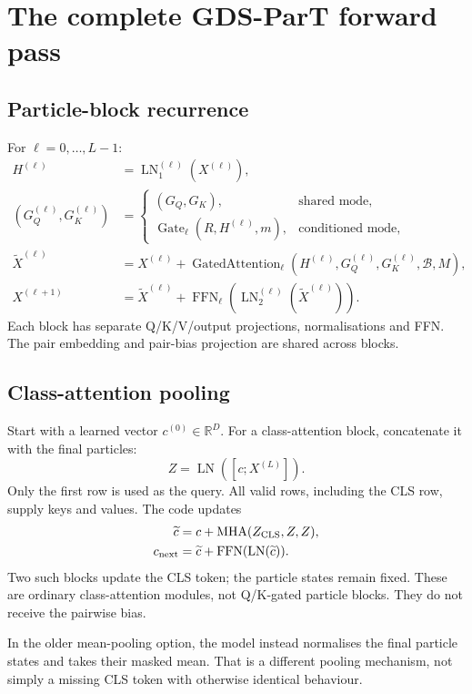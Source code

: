 \documentclass[11pt,a4paper]{article}
\newcommand{\R}{\mathbb R}
\newcommand{\LN}{\operatorname{LN}}
\newcommand{\FFN}{\operatorname{FFN}}
\numberwithin{equation}{section}
\begin{document}
\section{The complete GDS-ParT forward pass}
\subsection{Particle-block recurrence}
For $\ell=0,\ldots,L-1$:
\begin{align}
 H^{(\ell)}&=\LN_1^{(\ell)}(X^{(\ell)}),\\
 (G_Q^{(\ell)},G_K^{(\ell)})&=
 \begin{cases}
 (G_Q,G_K),&\text{shared mode},\\
 \operatorname{Gate}_{\ell}(R,H^{(\ell)},m),&\text{conditioned mode},
 \end{cases}\\
 \widetilde X^{(\ell)}
 &=X^{(\ell)}+
 \operatorname{GatedAttention}_{\ell}
 (H^{(\ell)},G_Q^{(\ell)},G_K^{(\ell)},\mathcal B,M),\\
 X^{(\ell+1)}
 &=\widetilde X^{(\ell)}
   +\FFN_\ell(\LN_2^{(\ell)}(\widetilde X^{(\ell)})).
\end{align}
Each block has separate Q/K/V/output projections, normalisations and FFN.
The pair embedding and pair-bias projection are shared across blocks.

\subsection{Class-attention pooling}
Start with a learned vector $c^{(0)}\in\R^D$.
For a class-attention block, concatenate it with the final particles:
\[
 Z=\LN([c;X^{(L)}]).
\]
Only the first row is used as the query. All valid rows, including the
CLS row, supply keys and values. The code updates
\begin{align}
 \widetilde c&=c+\operatorname{MHA}(Z_{\rm CLS},Z,Z),\\
 c_{\rm next}&=\widetilde c+\FFN(\LN(\widetilde c)).
\end{align}
Two such blocks update the CLS token; the particle states remain fixed.
These are ordinary class-attention modules, not Q/K-gated particle blocks.
They do not receive the pairwise bias.

In the older mean-pooling option, the model instead normalises the final
particle states and takes their masked mean. That is a different pooling
mechanism, not simply a missing CLS token with otherwise identical behaviour.
\end{document}
